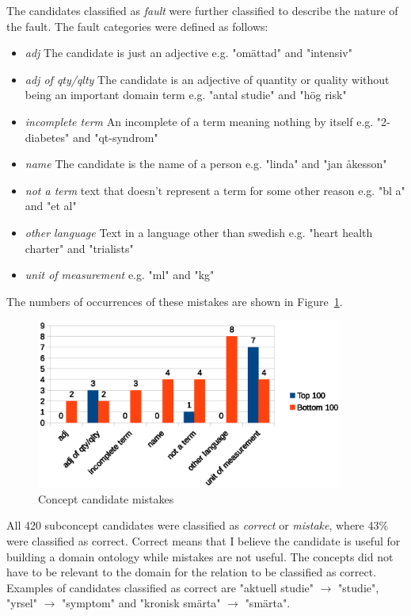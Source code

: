 \documentclass[a4paper]{report}
\begin{document}
The candidates classified as \emph{fault} were further classified to describe the nature of the fault.
The fault categories were defined as follows:
\begin{itemize}
  \item \emph{adj} The candidate is just an adjective e.g. "omättad" and "intensiv"
  \item \emph{adj of qty/qlty} The candidate is an adjective of quantity or quality without being an important domain term e.g. "antal studie" and "hög risk"
  \item \emph{incomplete term} An incomplete of a term meaning nothing by itself e.g. "2-diabetes" and "qt-syndrom"
  \item \emph{name} The candidate is the name of a person e.g. "linda" and "jan åkesson"
  \item \emph{not a term} text that doesn't represent a term for some other reason e.g. "bl a" and "et al"
  \item \emph{other language} Text in a language other than swedish e.g. "heart health charter" and "trialists"
  \item \emph{unit of measurement} e.g. "ml" and "kg"
\end{itemize}
The numbers of occurrences of these mistakes are shown in Figure~\ref{fig:concept-cand-mistakes}.

\begin{figure}
  \centering
  \includegraphics[width=0.9\textwidth]{graphics/concepts-mistakes.eps}
  \caption{Concept candidate mistakes}
  \label{fig:concept-cand-mistakes}
\end{figure}

All 420 subconcept candidates were classified as \emph{correct} or \emph{mistake}, where 43\% were classified as correct.
Correct means that I believe the candidate is useful for building a domain ontology while mistakes are not useful.
The concepts did not have to be relevant to the domain for the relation to be classified as correct.
Examples of candidates classified as correct are "aktuell studie" \(\rightarrow\) "studie", "yrsel" \(\rightarrow\) "symptom" and "kronisk smärta" \(\rightarrow\) "smärta".
\end{document}
